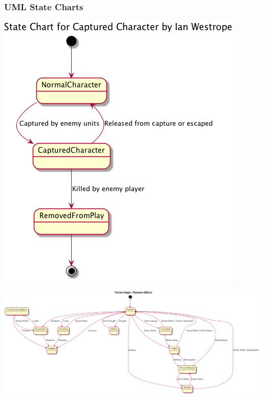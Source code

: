 \documentclass[12pt,a4paper,titlepage]{article}
\begin{document}
\subsubsection{UML State Charts}
\begin{center}
\includegraphics[width=\linewidth]{CharacterCapture}
\end{center}
\begin{center}
\includegraphics[width=\linewidth]{RandomSpellTerrainEffectsOverview.png}
\end{center}
\end{document}

